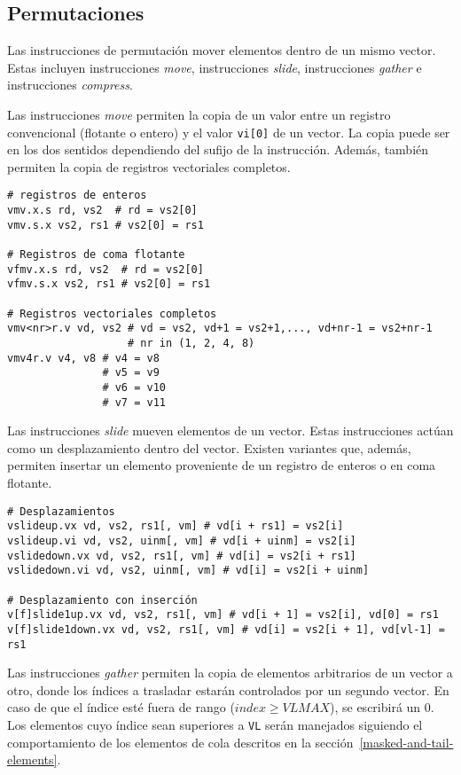 \subsection{Permutaciones}
Las instrucciones de permutación mover elementos dentro de un mismo
vector. Estas incluyen instrucciones \textit{move}, instrucciones
\textit{slide}, instrucciones \textit{gather} e instrucciones
\textit{compress}.

Las instrucciones \textit{move} permiten la copia de un valor entre un registro
convencional (flotante o entero) y el valor \texttt{vi[0]} de un vector. La
copia puede ser en los dos sentidos dependiendo del sufijo de la instrucción.
Además, también permiten la copia de registros vectoriales completos.

\begin{lstlisting}
# registros de enteros
vmv.x.s rd, vs2  # rd = vs2[0]
vmv.s.x vs2, rs1 # vs2[0] = rs1

# Registros de coma flotante
vfmv.x.s rd, vs2  # rd = vs2[0]
vfmv.s.x vs2, rs1 # vs2[0] = rs1

# Registros vectoriales completos
vmv<nr>r.v vd, vs2 # vd = vs2, vd+1 = vs2+1,..., vd+nr-1 = vs2+nr-1
                   # nr in (1, 2, 4, 8)
vmv4r.v v4, v8 # v4 = v8 
               # v5 = v9
               # v6 = v10
               # v7 = v11
\end{lstlisting}

Las instrucciones \textit{slide} mueven elementos de un vector. Estas instrucciones
actúan como un desplazamiento dentro del vector. Existen variantes que, además,
permiten insertar un elemento proveniente de un registro de enteros o en coma
flotante.

\begin{lstlisting}
# Desplazamientos
vslideup.vx vd, vs2, rs1[, vm] # vd[i + rs1] = vs2[i]
vslideup.vi vd, vs2, uinm[, vm] # vd[i + uinm] = vs2[i]
vslidedown.vx vd, vs2, rs1[, vm] # vd[i] = vs2[i + rs1]
vslidedown.vi vd, vs2, uinm[, vm] # vd[i] = vs2[i + uinm]

# Desplazamiento con inserción
v[f]slide1up.vx vd, vs2, rs1[, vm] # vd[i + 1] = vs2[i], vd[0] = rs1
v[f]slide1down.vx vd, vs2, rs1[, vm] # vd[i] = vs2[i + 1], vd[vl-1] = rs1
\end{lstlisting}

Las instrucciones \textit{gather} permiten la copia de elementos arbitrarios de
un vector a otro, donde los índices a trasladar estarán controlados por un
segundo vector. En caso de que el índice esté fuera de rango ($index \ge
VLMAX$), se escribirá un 0. Los elementos cuyo índice sean superiores a
\texttt{VL} serán manejados siguiendo el comportamiento de los elementos de
cola descritos en la sección~\ref{masked-and-tail-elements}.

